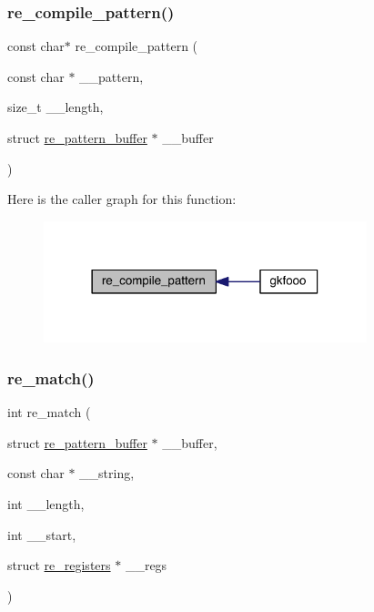 \subsubsection{\texorpdfstring{re\+\_\+compile\+\_\+pattern()}{re\_compile\_pattern()}}
{\footnotesize\ttfamily const char$\ast$ re\+\_\+compile\+\_\+pattern (\begin{DoxyParamCaption}\item[{const char $\ast$}]{\+\_\+\+\_\+pattern,  }\item[{size\+\_\+t}]{\+\_\+\+\_\+length,  }\item[{struct \hyperlink{a00686}{re\+\_\+pattern\+\_\+buffer} $\ast$}]{\+\_\+\+\_\+buffer }\end{DoxyParamCaption})}

Here is the caller graph for this function\+:\nopagebreak
\begin{figure}[H]
\begin{center}
\leavevmode
\includegraphics[width=266pt]{a00092_a25ae17445ee4ec90179552c9ed46752c_icgraph}
\end{center}
\end{figure}
\mbox{\label{a00092_af46593d8e7b4996e5c2f2677d6c2c7a9}} 
\subsubsection{\texorpdfstring{re\+\_\+match()}{re\_match()}}
{\footnotesize\ttfamily int re\+\_\+match (\begin{DoxyParamCaption}\item[{struct \hyperlink{a00686}{re\+\_\+pattern\+\_\+buffer} $\ast$}]{\+\_\+\+\_\+buffer,  }\item[{const char $\ast$}]{\+\_\+\+\_\+string,  }\item[{int}]{\+\_\+\+\_\+length,  }\item[{int}]{\+\_\+\+\_\+start,  }\item[{struct \hyperlink{a00690}{re\+\_\+registers} $\ast$}]{\+\_\+\+\_\+regs }\end{DoxyParamCaption})}

